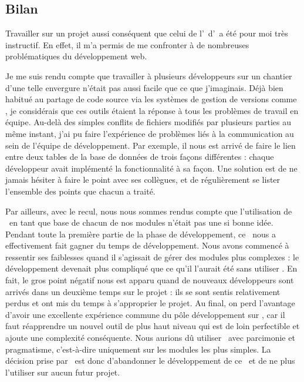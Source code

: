 \subsection{Bilan}
\label{section:eyrolles_bilan}

Travailler sur un projet aussi conséquent que celui de l'\aintranet\ d'\aey\ a été pour moi très instructif. En effet, il m'a permis de me confronter à de nombreuses problématiques du développement web.

Je me suis rendu compte que travailler à plusieurs développeurs sur un chantier d'une telle envergure n'était pas aussi facile que ce que j'imaginais. Déjà bien habitué au partage de code source via les systèmes de gestion de versions comme \asvn, je considérais que ces outils étaient la réponse à tous les problèmes de travail en équipe. Au-delà des simples conflits de fichiers modifiés par plusieurs parties au même instant, j'ai pu faire l'expérience de problèmes liés à la communication au sein de l'équipe de développement. Par exemple, il nous est arrivé de faire le lien entre deux tables de la base de données de trois façons différentes : chaque développeur avait implémenté la fonctionnalité à sa façon. Une solution est de ne jamais hésiter à faire le point avec ses collègues, et de régulièrement se lister l'ensemble des points que chacun a traité.

Par ailleurs, avec le recul, nous nous sommes rendus compte que l'utilisation de \asladmin\ en tant que base de chacun de nos modules n'était pas une si bonne idée. Pendant toute la première partie de la phase de développement, ce \aplugin\ nous a effectivement fait gagner du temps de développement. Nous avons commencé à ressentir ses faiblesses quand il s'agissait de gérer des modules plus complexes : le développement devenait plus compliqué que ce qu'il l'aurait été sans utiliser \asladmin. En fait, le gros point négatif nous est apparu quand de nouveaux développeurs sont arrivés dans un deuxième temps sur le projet : ils se sont sentis relativement perdus et ont mis du temps à s'approprier le projet. Au final, on perd l'avantage d'avoir une excellente expérience commune du pôle développement sur \asf, car il faut réapprendre un nouvel outil de plus haut niveau qui est de loin perfectible et ajoute une complexité conséquente. Nous aurions dû utiliser \asladmin\ avec parcimonie et pragmatisme, c'est-à-dire uniquement sur les modules les plus simples. La décision prise par \asl\ est donc d'abandonner le développement de ce \aplugin\ et de ne plus l'utiliser sur aucun futur projet.

